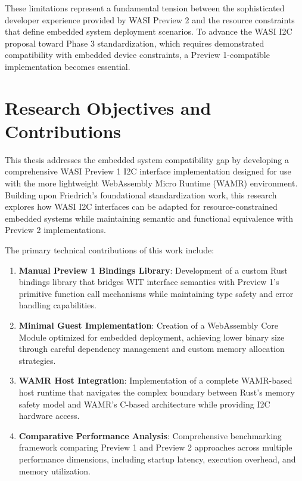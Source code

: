 These limitations represent a fundamental tension between the sophisticated developer experience provided by WASI Preview 2 and the resource constraints that define embedded system deployment scenarios. To advance the WASI I2C proposal toward Phase 3 standardization, which requires demonstrated compatibility with embedded device constraints, a Preview 1-compatible implementation becomes essential.

\section{Research Objectives and Contributions}
\label{sec:research-objectives}

This thesis addresses the embedded system compatibility gap by developing a comprehensive WASI Preview 1 I2C interface implementation designed for use with the more lightweight WebAssembly Micro Runtime (WAMR) environment. Building upon Friedrich's foundational standardization work, this research explores how WASI I2C interfaces can be adapted for resource-constrained embedded systems while maintaining semantic and functional equivalence with Preview 2 implementations.

The primary technical contributions of this work include:

\begin{enumerate}
    \item \textbf{Manual Preview 1 Bindings Library}: Development of a custom Rust bindings library that bridges WIT interface semantics with Preview 1's primitive function call mechanisms while maintaining type safety and error handling capabilities.
    
    \item \textbf{Minimal Guest Implementation}: Creation of a WebAssembly Core Module optimized for embedded deployment, achieving lower binary size through careful dependency management and custom memory allocation strategies.
    
    \item \textbf{WAMR Host Integration}: Implementation of a complete WAMR-based host runtime that navigates the complex boundary between Rust's memory safety model and WAMR's C-based architecture while providing I2C hardware access.
    
    \item \textbf{Comparative Performance Analysis}: Comprehensive benchmarking framework comparing Preview 1 and Preview 2 approaches across multiple performance dimensions, including startup latency, execution overhead, and memory utilization.
\end{enumerate}

